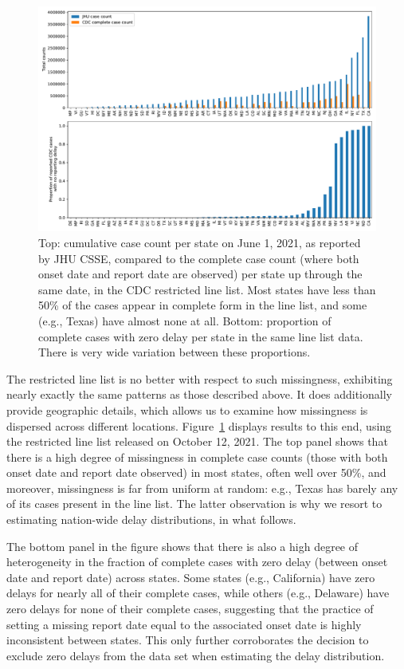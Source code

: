 \documentclass[sts]{imsart}
\theoremstyle{plain}
\theoremstyle{definition}
\theoremstyle{remark}
\begin{document}
\begin{figure}[tb]
\centering
\includegraphics[width=0.95\linewidth]{./figures/combined_linelist_plots_20210601.pdf}
\caption{Top: cumulative case count per state on June 1, 2021, as reported by
  JHU CSSE, compared to the complete case count (where both onset date and
  report date are observed) per state up through the same date, in the CDC
  restricted line list. Most states have less than 50\% of the cases appear in
  complete form in the line list, and some (e.g., Texas) have almost none at
  all. Bottom: proportion of complete cases with zero delay per state in the
  same line list data. There is very wide variation between these proportions.} 
\label{fig:line_list_state}
\end{figure}

The restricted line list is no better with respect to such missingness, 
exhibiting nearly exactly the same patterns as those described above. It
does additionally provide geographic details, which allows us to examine how  
missingness is dispersed across different locations. 
Figure~\ref{fig:line_list_state} displays results to this end, using  
the restricted line list released on October 12, 2021. The top panel shows that
there is a high degree of missingness in complete case counts (those with
both onset date and report date observed) in most states, often well over 50\%,
and moreover, missingness is far from uniform at random: e.g., Texas has barely
any of its cases present in the line list. The latter observation is why we
resort to estimating nation-wide delay distributions, in what follows. 

The bottom panel in the figure shows that there is also a high degree of
heterogeneity in the fraction of complete cases with zero delay (between onset
date and report date) across states. Some states (e.g., California) have zero
delays for nearly all of their complete cases, while others (e.g., Delaware)
have zero delays for none of their complete cases, suggesting that the practice
of setting a missing report date equal to the associated onset date is highly
inconsistent between states. This only further corroborates the decision to
exclude zero delays from the data set when estimating the delay distribution. 
\end{document}
